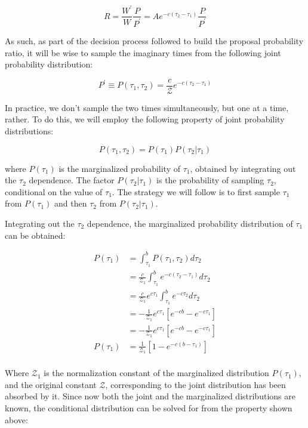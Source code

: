 \documentclass[12pt, two sided]{article}
\begin{document}
\begin{equation}
R =  \frac{W^\prime}{W} \frac{P}{P^\prime} = A e^{-c(\tau_2-\tau_1)} \frac{P}{P^\prime}
\end{equation}

As such, as part of the decision process followed to build the proposal probability ratio, it will be wise to sample the imaginary times from the following joint probability distribution:

\begin{equation}
P^\prime \equiv P(\tau_1,\tau_2) = \frac{c}{\mathcal{Z}} e^{-c(\tau_2-\tau_1)}
\end{equation}

In practice, we don't sample the two times simultaneously, but one at a time, rather. To do this, we will employ the following property of joint probability distributions:

\begin{equation}
P(\tau_1,\tau_2) = P(\tau_1) P(\tau_2 \vert \tau_1)
\end{equation}

where $P(\tau_1)$ is the marginalized probability of $\tau_1$, obtained by integrating out the $\tau_2$ dependence. The factor $P(\tau_2 \vert \tau_1)$ is the probability of sampling $\tau_2$, conditional on the value of $\tau_1$. The strategy we will follow is to first sample $\tau_1$ from $P(\tau_1)$ and then $\tau_2$ from $P(\tau_2 \vert \tau_1)$.

Integrating out the $\tau_2$ dependence, the marginalized probability distribution of $\tau_1$ can be obtained:

\begin{align}
P(\tau_1) &= \int_{\tau_1}^{b} P(\tau_1,\tau_2) d\tau_2 \\
&= \frac{c}{\mathcal{Z}_1} \int_{\tau_1}^{b} e^{-c(\tau_2-\tau_1)} d\tau_2 \\
&= \frac{c}{\mathcal{Z}_1} e^{c\tau_1} \int_{\tau_1}^{b} e^{-c\tau_2} d\tau_2 \\
&= -\frac{1}{\mathcal{Z}_1} e^{c\tau_1} [e^{-cb}-e^{-c\tau_1}] \\
&= -\frac{1}{\mathcal{Z}_1} e^{c\tau_1} [e^{-cb}-e^{-c\tau_1}] \\
P(\tau_1) &= \frac{1}{\mathcal{Z}_1}  [1-e^{-c(b-\tau_1)}] \\
\end{align}

Where $\mathcal{Z}_1$ is the normalization constant of the marginalized distribution $P(\tau_1)$, and the original constant $\mathcal{Z}$, corresponding to the joint distribution has been absorbed by it. Since now both the joint and the marginalized distributions are known, the conditional distribution can be solved for from the property shown above:
\end{document}
